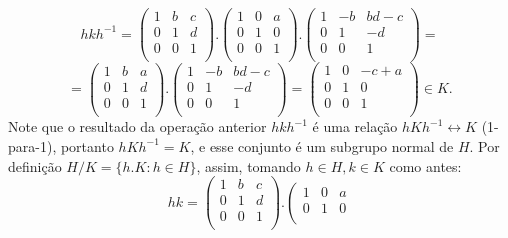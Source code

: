 \documentclass{article}
\begin{document}
\begin{enumerate}
		$$
		hkh^{-1} = \left(
		\begin{array}{ccc}
		1 & b & c\\
		0 & 1 & d \\
		0 & 0 & 1 \\
		\end{array}
		\right).
		\left(
		\begin{array}{ccc}
		1 & 0 & a\\
		0 & 1 & 0 \\
		0 & 0 & 1 \\
		\end{array}
		\right).
		\left(
		\begin{array}{ccc}
		1 & -b & bd - c\\
		0 & 1 & -d \\
		0 & 0 & 1 \\
		\end{array}
		\right) = 
		$$
		$$
		= \left(
		\begin{array}{ccc}
		1 & b & a\\
		0 & 1 & d \\
		0 & 0 & 1 \\
		\end{array}
		\right).
		\left(
		\begin{array}{ccc}
		1 & -b & bd - c\\
		0 & 1 & -d \\
		0 & 0 & 1 \\
		\end{array}
		\right) =
		\left(
		\begin{array}{ccc}
		1 & 0 & -c+a\\
		0 & 1 & 0 \\
		0 & 0 & 1 \\
		\end{array}
		\right) \in K.
		$$
		Note que o resultado da operação anterior $	hkh^{-1}$ é uma relação $hKh^{-1} \leftrightarrow K$ (1-para-1), portanto $hKh^{-1} = K$, e esse conjunto é um subgrupo normal de $H$. Por definição $H/K = \{h.K: h \in H\}$, assim, tomando $h \in H, k \in K$ como antes:
		$$
		hk = \left(
		\begin{array}{ccc}
		1 & b & c\\
		0 & 1 & d \\
		0 & 0 & 1 \\
		\end{array}
		\right).
		\left(
		\begin{array}{ccc}
		1 & 0 & a\\
		0 & 1 & 0 \\

\end{array}$$
\end{enumerate}
\end{document}
